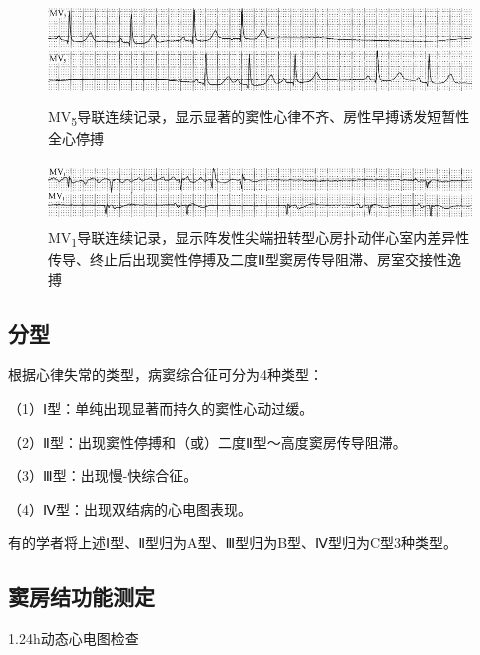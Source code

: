 \begin{figure}[!htbp]
 \centering
 \includegraphics[width=5.58333in,height=1.09375in]{./images/Image00459.jpg}
 \captionsetup{justification=centering}
 \caption{MV\textsubscript{5}导联连续记录，显示显著的窦性心律不齐、房性早搏诱发短暂性全心停搏}
 \label{fig27-4}
  \end{figure} 


\begin{figure}[!htbp]
 \centering
 \includegraphics[width=5.58333in,height=0.63542in]{./images/Image00460.jpg}
 \captionsetup{justification=centering}
 \caption{MV\textsubscript{1}导联连续记录，显示阵发性尖端扭转型心房扑动伴心室内差异性传导、终止后出现窦性停搏及二度Ⅱ型窦房传导阻滞、房室交接性逸搏}
 \label{fig27-5}
  \end{figure} 


\protect\hypertarget{text00034.htmlux5cux23subid411}{}{}

\subsection{分型}

根据心律失常的类型，病窦综合征可分为4种类型：

（1）Ⅰ型：单纯出现显著而持久的窦性心动过缓。

（2）Ⅱ型：出现窦性停搏和（或）二度Ⅱ型～高度窦房传导阻滞。

（3）Ⅲ型：出现慢-快综合征。

（4）Ⅳ型：出现双结病的心电图表现。

有的学者将上述Ⅰ型、Ⅱ型归为A型、Ⅲ型归为B型、Ⅳ型归为C型3种类型。

\protect\hypertarget{text00034.htmlux5cux23subid412}{}{}

\subsection{窦房结功能测定}

1.24h动态心电图检查

